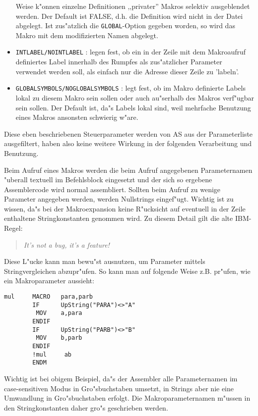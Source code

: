 \documentclass[12pt,a4paper,twoside]{report}
\newcommand{\ii}[1]{{\it #1}}
\newcommand{\tty}[1]{{\tt #1}}
\begin{document}
\begin{itemize}
{      Weise k"onnen einzelne Definitionen ,,privater'' Makros selektiv
      ausgeblendet werden.  Der Default ist FALSE, d.h. die Definition
      wird nicht in der Datei abgelegt.  Ist zus"atzlich die
      \tty{GLOBAL}-Option gegeben worden, so wird das Makro mit dem
      modifizierten Namen abgelegt.}
\item{\tty{INTLABEL/NOINTLABEL} : legen fest, ob ein in der Zeile mit
      dem Makroaufruf definiertes Label innerhalb des Rumpfes als
      zus"atzlicher Parameter verwendet werden soll, als einfach
      nur die Adresse dieser Zeile zu 'labeln'.}
\item{\tty{GLOBALSYMBOLS/NOGLOBALSYMBOLS} : legt fest, ob im
      Makro definierte Labels lokal zu diesem Makro sein sollen
      oder auch au"serhalb des Makros verf"ugbar sein sollen.
      Der Default ist, da"s Labels lokal sind, weil mehrfache
      Benutzung eines Makros ansonsten schwierig w"are.}
\end{itemize}
Diese eben beschriebenen Steuerparameter werden von AS aus der
Parameterliste ausgefiltert, haben also keine weitere Wirkung in
der folgenden Verarbeitung und Benutzung.
\par
Beim Aufruf eines Makros werden die beim Aufruf angegebenen
Parameternamen "uberall textuell im Befehlsblock eingesetzt und der
sich so ergebene Assemblercode wird normal assembliert.  Sollten
beim Aufruf zu wenige Parameter angegeben werden, werden Nullstrings
eingef"ugt.  Wichtig ist zu wissen, da"s bei der Makroexpansion keine
R"ucksicht auf eventuell in der Zeile enthaltene Stringkonstanten
genommen wird.  Zu diesem Detail gilt die alte IBM-Regel:
\begin{quote}
\ii{It's not a bug, it's a feature!}
\end {quote}
Diese L"ucke kann man bewu"st ausnutzen, um Parameter mittels
Stringvergleichen abzupr"ufen.  So kann man auf folgende Weise
z.B. pr"ufen, wie ein Makroparameter aussieht:
\begin{verbatim}
mul     MACRO   para,parb
        IF      UpString("PARA")<>"A"
         MOV    a,para
        ENDIF
        IF      UpString("PARB")<>"B"
         MOV    b,parb
        ENDIF
        !mul     ab
        ENDM
\end{verbatim}
Wichtig ist bei obigem Beispiel, da"s der Assembler alle
Parameternamen im case-sensitiven Modus in Gro"sbuchstaben
umsetzt, in Strings aber nie eine Umwandlung in Gro"sbuchstaben
erfolgt. Die Makroparameternamen m"ussen in den Stringkonstanten
daher gro"s geschrieben werden.
\par
\end{document}
